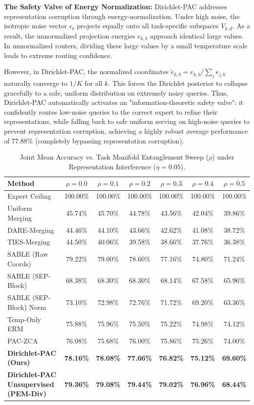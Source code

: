 \textbf{The Safety Valve of Energy Normalization:} Dirichlet-PAC addresses representation corruption through energy-normalization. Under high noise, the isotropic noise vector $\epsilon_b$ projects equally onto all task-specific subspaces $V_{k, d}$. As a result, the unnormalized projection energies $e_{k, b}$ approach identical large values. In unnormalized routers, dividing these large values by a small temperature scale leads to extreme routing confidence. 

However, in Dirichlet-PAC, the normalized coordinates $\tilde{e}_{k, b} = e_{k, b} / \sum_j e_{j, b}$ naturally converge to $1/K$ for all $k$. This forces the Dirichlet posterior to collapse gracefully to a safe, uniform distribution on extremely noisy queries. Thus, Dirichlet-PAC automatically activates an "information-theoretic safety valve": it confidently routes low-noise queries to the correct expert to refine their representations, while falling back to safe uniform serving on high-noise queries to prevent representation corruption, achieving a highly robust average performance of $77.88\%$ (completely bypassing representation corruption).
\begin{table}[t]
\centering
\caption{Joint Mean Accuracy vs. Task Manifold Entanglement Sweep ($\rho$) under Representation Interference ($\eta = 0.05$).}
\label{tab:sweep_results}
\vskip 0.1in
\begin{tabular}{lcccccc}
\toprule
\textbf{Method} & \textbf{$\rho = 0.0$} & \textbf{$\rho = 0.1$} & \textbf{$\rho = 0.2$} & \textbf{$\rho = 0.3$} & \textbf{$\rho = 0.4$} & \textbf{$\rho = 0.5$} \\
\midrule
Expert Ceiling & 100.00\% & 100.00\% & 100.00\% & 100.00\% & 100.00\% & 100.00\% \\
Uniform Merging & 45.74\% & 45.70\% & 44.78\% & 43.56\% & 42.04\% & 39.86\% \\
DARE-Merging & 44.46\% & 44.10\% & 43.66\% & 42.62\% & 41.08\% & 38.72\% \\
TIES-Merging & 44.50\% & 40.06\% & 39.58\% & 38.66\% & 37.76\% & 36.38\% \\
\midrule
SABLE (Raw Coords) & 79.22\% & 79.00\% & 78.60\% & 77.16\% & 74.80\% & 71.24\% \\
SABLE (SEP-Block) & 68.38\% & 68.30\% & 68.30\% & 68.14\% & 67.58\% & 65.96\% \\
SABLE (SEP-Block) Norm & 73.10\% & 72.98\% & 72.76\% & 71.72\% & 69.20\% & 63.36\% \\
Temp-Only ERM & 75.88\% & 75.96\% & 75.50\% & 75.22\% & 74.98\% & 74.12\% \\
PAC-ZCA & 76.08\% & 75.68\% & 76.00\% & 75.86\% & 75.26\% & 74.00\% \\
\midrule
\textbf{Dirichlet-PAC (Ours)} & \textbf{78.16\%} & \textbf{78.08\%} & \textbf{77.66\%} & \textbf{76.82\%} & \textbf{75.12\%} & \textbf{69.60\%} \\
\textbf{Dirichlet-PAC Unsupervised (PEM-Div)} & \textbf{79.36\%} & \textbf{79.08\%} & \textbf{79.44\%} & \textbf{79.02\%} & \textbf{76.96\%} & \textbf{68.44\%} \\
\bottomrule
\end{tabular}
\end{table}

